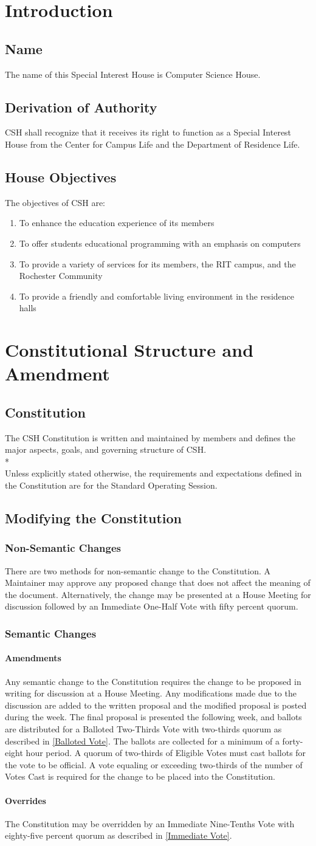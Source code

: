 \documentclass{article}
\newcommand{\article}[1]{\section{#1} \label{#1}}
\newcommand{\asection}[1]{\subsection{#1} \label{#1}}
\newcommand{\asubsection}[1]{\subsubsection{#1} \label{#1}}
\newcommand{\asubsubsection}[1]{\paragraph{#1} \label{#1}}
\begin{document}
\article{Introduction}

\asection{Name}
The name of this Special Interest House is Computer Science House.

\asection{Derivation of Authority}
CSH shall recognize that it receives its right to function as a Special Interest House from the Center for Campus Life and the Department of Residence Life.

\asection{House Objectives}
The objectives of CSH are:
\begin{enumerate}
	\item To enhance the education experience of its members
	\item To offer students educational programming with an emphasis on computers
	\item To provide a variety of services for its members, the RIT campus, and the Rochester Community
	\item To provide a friendly and comfortable living environment in the residence halls
\end{enumerate}

\article{Constitutional Structure and Amendment}

\asection{Constitution}
The CSH Constitution is written and maintained by members and defines the major aspects, goals, and governing structure of CSH.
\\*\\
Unless explicitly stated otherwise, the requirements and expectations defined in the Constitution are for the Standard Operating Session.

\subsection{Modifying the Constitution}
\asubsection{Non-Semantic Changes}
There are two methods for non-semantic change to the Constitution.
A Maintainer may approve any proposed change that does not affect the meaning of the document.
Alternatively, the change may be presented at a House Meeting for discussion followed by an Immediate One-Half Vote with fifty percent quorum.

\asubsection{Semantic Changes}
\asubsubsection{Amendments}
Any semantic change to the Constitution requires the change to be proposed in writing for discussion at a House Meeting.
Any modifications made due to the discussion are added to the written proposal and the modified proposal is posted during the week.
The final proposal is presented the following week, and ballots are distributed for a Balloted Two-Thirds Vote with two-thirds quorum as described in \ref{Balloted Vote}.
The ballots are collected for a minimum of a forty-eight hour period.
A quorum of two-thirds of Eligible Votes must cast ballots for the vote to be official.
A vote equaling or exceeding two-thirds of the number of Votes Cast is required for the change to be placed into the Constitution.
\asubsubsection{Overrides}
The Constitution may be overridden by an Immediate Nine-Tenths Vote with eighty-five percent quorum as described in \ref{Immediate Vote}.
\end{document}
